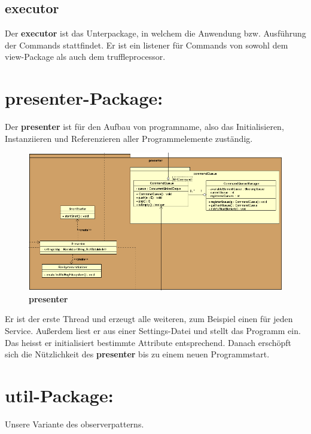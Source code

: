     \subsection*{\textbf{executor}}
    Der \textbf{executor} ist das Unterpackage, in welchem die Anwendung bzw. Ausführung der Commands stattfindet. Er ist ein \gls{listener} für Commands von sowohl dem view-Package als auch dem truffleprocessor.


\section{\textbf{presenter-Package:}}


Der \textbf{presenter} ist für den Aufbau von \gls{programname}, also das Initialisieren, Instanziieren und Referenzieren aller Programmelemente zuständig.

\begin{figure}[H]
  \centering
  \includegraphics[width=\textwidth]{../diagramimages/presenter.png}
  \caption{\textbf{presenter}}
\end{figure}

Er ist der erste Thread und erzeugt alle weiteren, zum Beispiel einen für jeden Service. Außerdem liest er aus einer Settings-Datei und stellt das Programm ein.
Das heisst er initialisiert bestimmte Attribute entsprechend. Danach erschöpft sich die Nützlichkeit des \textbf{presenter} bis zu einem neuen Programmstart.


\section{\textbf{util-Package:}}


Unsere Variante des \gls{observerpattern}s.

